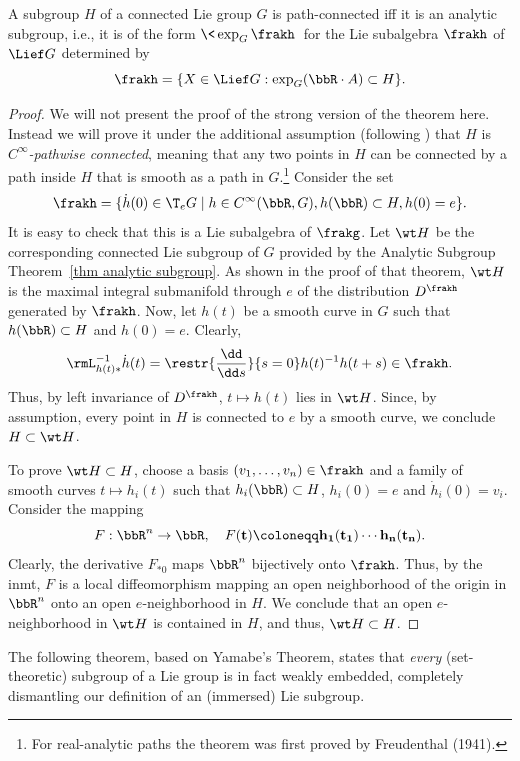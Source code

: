 \begin{thm}\label{thm Yamabe}
    A subgroup $H$ of a connected Lie group $G$ is path-connected iff it is an analytic subgroup, i.e., it is of the form $\<\exp_G\frakh\>$ for the Lie subalgebra $\frakh$ of $\Lief G$ determined by 
    \[\frakh=\{X\in\Lief G: \exp_G(\bbR\cdot A)\subset H\}.\]
\end{thm}
\begin{proof}
    We will not present the proof of the strong version of the theorem here. Instead we will prove it under the additional assumption (following \cite[Lem.~1.7.10]{RS2}) that $H$ is \emph{$C^\infty$-pathwise connected}, meaning that any two points in $H$ can be connected by a path inside $H$ that is smooth as a path in $G$.\footnote{For real-analytic paths the theorem was first proved by Freudenthal (1941).} Consider the set
    \[\frakh=\{\dot h(0)\in \T_eG\mid h\in C^\infty(\bbR,G),h(\bbR)\subset H,h(0)=e\}.\]
    It is easy to check that this is a Lie subalgebra of $\frakg$. Let $\wt H$ be the corresponding connected Lie subgroup of $G$ provided by the Analytic Subgroup Theorem~\ref{thm analytic subgroup}. As shown in the proof of that theorem, $\wt H$ is the maximal integral submanifold through $e$ of the distribution $D^\frakh$ generated by $\frakh$. Now, let $h(t)$ be a smooth curve in $G$ such that $h(\bbR)\subset H$ and $h(0)=e$. Clearly,
    \[\rmL_{h(t)\ast}^{-1}\dot h(t)=\restr{\frac{\dd}{\dd s}}{s=0}h(t)^{-1}h(t+s)\in\frakh.\]
    Thus, by left invariance of $D^\frakh$, $t\mapsto h(t)$ lies in $\wt H$. Since, by assumption, every point in $H$ is connected to $e$ by a smooth curve, we conclude $H\subset \wt H$.

    To prove $\wt H\subset H$, choose a basis $(v_1,\ldots,v_n)\in \frakh$ and a family of smooth curves $t\mapsto h_i(t)$ such that $h_i(\bbR)\subset H$, $h_i(0)=e$ and $\dot h_i(0)=v_i$. Consider the mapping
    \[F:\bbR^n\to \bbR,\quad F(\bf{t})\coloneqq h_1(t_1)\cdots h_n(t_n).\]
    Clearly, the derivative $F_{\ast 0}$ maps $\bbR^n$ bijectively onto $\frakh$. Thus, by the \gls{inmt}, $F$ is a local diffeomorphism mapping an open neighborhood of the origin in $\bbR^n$ onto an open $e$-neighborhood in $H$. We conclude that an open $e$-neighborhood in $\wt H$ is contained in $H$, and thus, $\wt H\subset H$.
\end{proof}

The following theorem, based on Yamabe's Theorem, states that \emph{every} (set-theoretic) subgroup of a Lie group is in fact weakly embedded, completely dismantling our definition of an (immersed) Lie subgroup.


